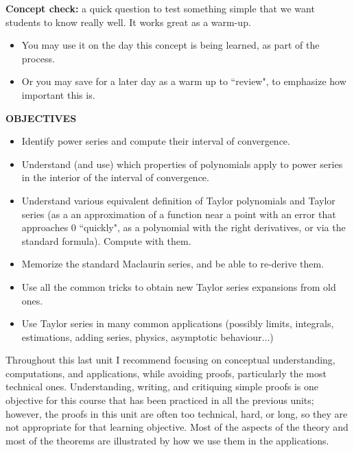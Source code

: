 \documentclass[11pt]{article}
\begin{document}
	 {\bf Concept check:}  a quick question to test something simple that we want students to know really well.  It works great as a warm-up.
		\begin{itemize}
			\item You may use it on the day this concept is being learned, as part of the process.
			\item Or you may save for a later day as a warm up to ``review", to emphasize how important this is.
		\end{itemize}

\vspace{5mm}
		
{\bf OBJECTIVES}

	\begin{itemize}
		\item Identify power series and compute their interval of convergence.   %
		\item  Understand (and use) which properties of polynomials apply to power series in the interior of the interval of convergence.
		\item Understand various equivalent definition of Taylor polynomials and Taylor series (as a an approximation of a function near a point with an error that approaches 0 ``quickly", as a polynomial with the right derivatives, or via the standard formula).  Compute with them.
		\item  Memorize the standard Maclaurin series, and be able to re-derive them.
		\item  Use all the common tricks to obtain new Taylor series expansions from old ones.
		\item  Use Taylor series in many common applications (possibly limits, integrals, estimations, adding series, physics, asymptotic behaviour...)
	\end{itemize}

Throughout this last unit I recommend focusing on conceptual understanding, computations, and applications, while avoiding proofs, particularly the most technical ones.    Understanding, writing, and critiquing simple proofs is one objective for this course that has been practiced in all the previous units; however, the proofs in this unit are often too technical, hard, or long, so they are not appropriate for that learning objective.  Most of the aspects of the theory and most of the theorems are illustrated by how we use them in the applications.
\end{document}

